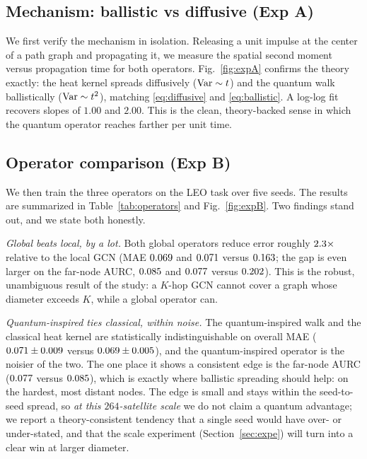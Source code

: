 

\subsection{Mechanism: ballistic vs diffusive (Exp A)}
We first verify the mechanism in isolation. Releasing a unit impulse at the center of
a path graph and propagating it, we measure the spatial second moment versus
propagation time for both operators. Fig.~\ref{fig:expA} confirms the theory exactly:
the heat kernel spreads diffusively ($\operatorname{Var}\sim t$) and the quantum walk ballistically
($\operatorname{Var}\sim t^2$), matching \eqref{eq:diffusive} and \eqref{eq:ballistic}. A log-log
fit recovers slopes of $1.00$ and $2.00$. This is the clean, theory-backed sense in
which the quantum operator reaches farther per unit time.



\subsection{Operator comparison (Exp B)}
We then train the three operators on the LEO task over five seeds. The results are
summarized in Table~\ref{tab:operators} and Fig.~\ref{fig:expB}. Two findings stand
out, and we state both honestly.

\textit{Global beats local, by a lot.} Both global operators reduce error roughly
$2.3\times$ relative to the local GCN (MAE $0.069$ and $0.071$ versus
$0.163$; the gap is even larger on the far-node AURC, $0.085$ and $0.077$
versus $0.202$). This is the robust, unambiguous result of the study: a $K$-hop
GCN cannot cover a graph whose diameter exceeds $K$, while a global operator can.

\textit{Quantum-inspired ties classical, within noise.} The quantum-inspired walk and
the classical heat kernel are statistically indistinguishable on overall MAE
($0.071\pm0.009$ versus $0.069\pm0.005$), and the quantum-inspired operator
is the noisier of the two. The one place it shows a consistent edge is the far-node
AURC ($0.077$ versus $0.085$), which is exactly where ballistic spreading
should help: on the hardest, most distant nodes. The edge is small and stays within
the seed-to-seed spread, so \emph{at this $264$-satellite scale} we do not claim a
quantum advantage; we report a theory-consistent tendency that a single seed would have
over- or under-stated, and that the scale experiment (Section~\ref{sec:expe}) will turn
into a clear win at larger diameter.

